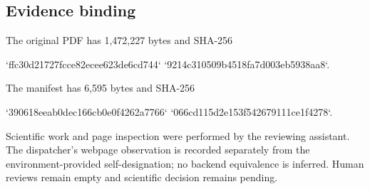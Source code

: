 \documentclass[10pt]{article}
\begin{document}
\subsection*{Evidence binding}
The original PDF has 1,472,227 bytes and SHA-256\par
`ffc30d21727fcce82ecee623de6cd744` `9214c310509b4518fa7d003eb5938aa8`.\par
The manifest has 6,595 bytes and SHA-256\par
`390618eeab0dec166cb0e0f4262a7766` `066cd115d2e153f542679111ce1f4278`.\par
Scientific work and page inspection were performed by the reviewing assistant. The dispatcher’s webpage observation is recorded separately from the environment-provided self-designation; no backend equivalence is inferred. Human reviews remain empty and scientific decision remains pending.\par
\end{document}
